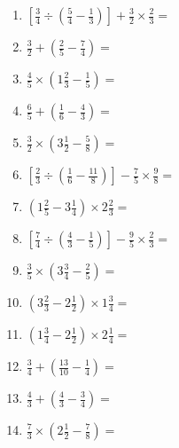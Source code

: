 \documentclass[12pt]{article}
\begin{document}
\begin{enumerate}[ itemsep=1.5cm]
	\item $\displaystyle \left[ \frac{3}{4} \div \left( \frac{5}{4} - \frac{1}{3} \right) \right] + \frac{3}{2} \times \frac{2}{3} =$
	\item $\displaystyle \frac{3}{2} + \left( \frac{2}{5} - \frac{7}{4} \right) =$
	\item $\displaystyle \frac{4}{5} \times \left( 1 \frac{2}{3} - \frac{1}{5} \right) =$
	\item $\displaystyle \frac{6}{5} + \left( \frac{1}{6} - \frac{4}{3} \right) =$
	\item $\displaystyle \frac{3}{2} \times \left( 3 \frac{1}{2} - \frac{5}{8} \right) =$
	\item $\displaystyle \left[ \frac{2}{3} \div \left( \frac{1}{6} - \frac{11}{8} \right) \right] - \frac{7}{5} \times \frac{9}{8} =$
	\item $\displaystyle \left( 1 \frac{2}{5} - 3 \frac{1}{4} \right) \times 2 \frac{2}{3} =$
	\item $\displaystyle \left[ \frac{7}{4} \div \left( \frac{4}{3} - \frac{1}{5} \right) \right] - \frac{9}{5} \times \frac{2}{3} =$
	\item $\displaystyle \frac{3}{5} \times \left( 3 \frac{3}{4} - \frac{2}{5} \right) =$

	\item $\displaystyle \left( 3 \frac{2}{3} - 2 \frac{1}{2} \right) \times 1 \frac{3}{4} =$
	\item $\displaystyle \left( 1 \frac{3}{4} - 2 \frac{1}{2} \right) \times 2 \frac{1}{4} =$
	\item $\displaystyle \frac{3}{4} + \left( \frac{13}{10} - \frac{1}{4} \right) =$
	\item $\displaystyle \frac{4}{3} + \left( \frac{4}{3} - \frac{3}{4} \right) =$
	\item $\displaystyle \frac{7}{3} \times \left( 2 \frac{1}{2} - \frac{7}{8} \right) =$
\end{enumerate}
\end{document}
